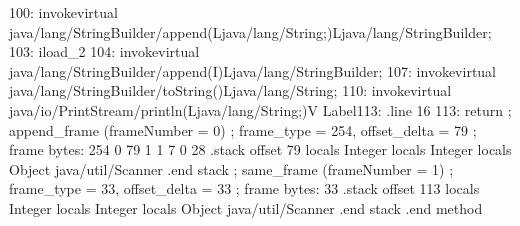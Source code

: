 \documentclass[12pt,a4paper,twoside]{report}
\begin{document}
\begin{terminal}
  100: invokevirtual java/lang/StringBuilder/append(Ljava/lang/String;)Ljava/lang/StringBuilder;
  103: iload_2
  104: invokevirtual java/lang/StringBuilder/append(I)Ljava/lang/StringBuilder;
  107: invokevirtual java/lang/StringBuilder/toString()Ljava/lang/String;
  110: invokevirtual java/io/PrintStream/println(Ljava/lang/String;)V
Label113:
  .line 16
  113: return
  ; append_frame (frameNumber = 0)
  ; frame_type = 254, offset_delta = 79
  ; frame bytes: 254 0 79 1 1 7 0 28
  .stack
    offset 79
    locals Integer
    locals Integer
    locals Object java/util/Scanner
    .end stack
  ; same_frame (frameNumber = 1)
  ; frame_type = 33, offset_delta = 33
  ; frame bytes: 33
  .stack
    offset 113
    locals Integer
    locals Integer
    locals Object java/util/Scanner
    .end stack
.end method
\end{terminal}
\end{document}
